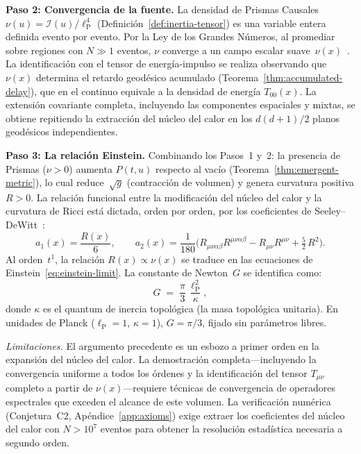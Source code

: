 \documentclass[11pt, a4paper, openany]{book}
\newcommand{\lP}{\ell_{\mathrm{P}}}
\begin{document}
\medskip
\noindent\textbf{Paso 2: Convergencia de la fuente.}
La densidad de Prismas Causales $\nu(u) = \mathcal{I}(u)/\lP^4$
(Definici\'on~\ref{def:inertia-tensor}) es una variable entera
definida evento por evento. Por la Ley de los Grandes N\'umeros, al
promediar sobre regiones con $N \gg 1$ eventos, $\nu$ converge a un
campo escalar suave~$\nu(x)$~\cite{bombelli1987}. La
identificaci\'on con el tensor de energ\'ia-impulso se realiza
observando que $\nu(x)$ determina el retardo geod\'esico acumulado
(Teorema~\ref{thm:accumulated-delay}), que en el continuo equivale a
la densidad de energ\'ia $T_{00}(x)$. La extensi\'on covariante
completa, incluyendo las componentes espaciales y mixtas, se obtiene
repitiendo la extracci\'on del n\'ucleo del calor en los $d(d+1)/2$
planos geod\'esicos independientes.

\medskip
\noindent\textbf{Paso 3: La relaci\'on Einstein.}
Combinando los Pasos~1 y~2: la presencia de Prismas ($\nu > 0$)
aumenta $P(t,u)$ respecto al vac\'io
(Teorema~\ref{thm:emergent-metric}), lo cual reduce~$\sqrt{g}$
(contracci\'on de volumen) y genera curvatura positiva $R > 0$. La
relaci\'on funcional entre la modificaci\'on del n\'ucleo del calor y
la curvatura de Ricci est\'a dictada, orden por orden, por los
coeficientes de Seeley--DeWitt~\cite{minakshisundaram1949,gilkey1975}:
\[
  a_1(x) = \frac{R(x)}{6},
  \qquad
  a_2(x) = \frac{1}{180}\bigl(
    R_{\mu\nu\alpha\beta}R^{\mu\nu\alpha\beta}
    - R_{\mu\nu}R^{\mu\nu}
    + \tfrac{5}{2}\,R^2
  \bigr).
\]
Al orden~$t^1$, la relaci\'on $R(x) \propto \nu(x)$ se traduce en
las ecuaciones de Einstein~\eqref{eq:einstein-limit}. La constante de
Newton~$G$ se identifica como:
\begin{equation}
  G \;=\; \frac{\pi}{3}\,\frac{\lP^2}{\kappa},
  \label{eq:newton-identification}
\end{equation}
donde $\kappa$ es el quantum de inercia topol\'ogica (la masa
topol\'ogica unitaria). En unidades de Planck ($\lP = 1$,
$\kappa = 1$), $G = \pi/3$, fijado sin par\'ametros libres.

\medskip
\noindent\textit{Limitaciones.}
El argumento precedente es un esbozo a primer orden en la expansi\'on
del n\'ucleo del calor. La demostraci\'on completa---incluyendo la
convergencia uniforme a todos los \'ordenes y la identificaci\'on del
tensor $T_{\mu\nu}$ completo a partir de $\nu(x)$---requiere
t\'ecnicas de convergencia de operadores espectrales que exceden el
alcance de este volumen. La verificaci\'on num\'erica (Conjetura~C2,
Ap\'endice~\ref{app:axioms}) exige extraer los coeficientes del
n\'ucleo del calor con $N > 10^7$ eventos para obtener la resoluci\'on
estad\'istica necesaria a segundo orden.
\end{document}
